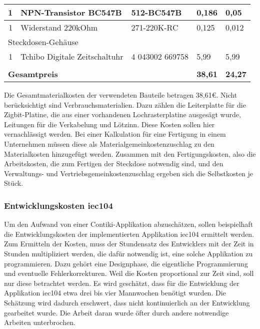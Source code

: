 \begin{table}[btp]
\begin{tabular}{|r|l|l|p{2cm}|p{2cm}|}
  1 & NPN-Transistor BC547B & 512-BC547B & 0,186 & 0,05 \\ \hline
  1 & Widerstand 220kOhm & 271-220K-RC & 0,125 & 0,012 \\ \hline
  \multicolumn{5}{|l|}{Steckdosen-Gehäuse} \\ \hline
  1 & Tchibo Digitale Zeitschaltuhr & 4 043002 669758 & 5,99 & 5,99 \\ \hline
  \multicolumn{5}{|l|}{} \\ \hline
  \multicolumn{3}{|l|}{\textbf{Gesamtpreis}} & \textbf{38,61} & \textbf{24,27} \\ \hline
\end{tabular}
\label{tab:hardwarekosten}
\end{table}

Die Gesamtmaterialkosten der verwendeten Bauteile betragen 38,61€. Nicht berücksichtigt sind Verbrauchsmaterialien. Dazu zählen die Leiterplatte für die Zigbit-Platine, die aus einer vorhandenen Lochrasterplatine ausgesägt wurde, Leitungen für die Verkabelung und Lötzinn. Diese Kosten sollen hier vernachlässigt werden. Bei einer Kalkulation für eine Fertigung in einem Unternehmen müssen diese als Materialgemeinkostenzuschlag zu den Materialkosten hinzugefügt werden. Zusammen mit den Fertigungskosten, also die Arbeitskosten, die zum Fertigen der Steckdose notwendig sind, und den Verwaltungs- und Vertriebsgemeinkostenzuschlag ergeben sich die Selbstkosten je Stück.



\subsubsection{Entwicklungskosten iec104}

Um den Aufwand von einer Contiki-Applikation abzuschätzen, sollen beispielhaft die Entwicklungskosten der implementierten Applikation iec104 ermittelt werden. Zum Ermitteln der Kosten, muss der Stundensatz des Entwicklers mit der Zeit in Stunden multipliziert werden, die dafür notwendig ist, eine solche Applikation zu programmieren. Dazu gehört eine Designphase, die eigentliche Programmierung und eventuelle Fehlerkorrekturen. Weil die Kosten proportional zur Zeit sind, soll nur diese betrachtet werden. Es wird geschätzt, dass für die Entwicklung der Applikation iec104 etwa drei bis vier Mannwochen benötigt wurden. Die Schätzung wird dadurch erschwert, dass nicht kontinuierlich an der Entwicklung gearbeitet wurde. Die Arbeit daran wurde öfter durch andere notwendige Arbeiten unterbrochen.

